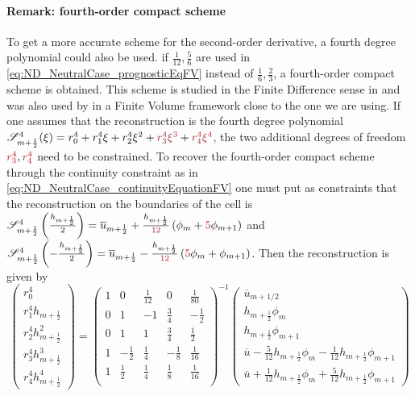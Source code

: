 \paragraph{Remark: fourth-order compact scheme}
To get a more accurate scheme for the second-order derivative,
a fourth degree polynomial could also be used.
if $\frac{1}{12}, \frac{5}{6}$ are used in
\eqref{eq:ND_NeutralCase_prognosticEqFV} instead of
$\frac{1}{6}, \frac{2}{3}$, a fourth-order compact scheme
is obtained. This scheme is studied in the Finite Difference sense
in \citep{adam_highly_1977} and was also used
by \citep{piller_finite-volume_2004} in a Finite Volume framework
close to the one we are using.
If one assumes that the reconstruction is the fourth degree
polynomial
${\cal S}_{m+\frac{1}{2}}^4(\xi) = r_0^4 + r_1^4 \xi + r_2^4 \xi^2 
+ \emphase{r_3^4 \xi^3} + \emphase{r_4^4 \xi^4}$,
the two additional degrees of freedom $\emphase{r_3^4},
\emphase{r_4^4}$ need to be
constrained. To recover the fourth-order compact scheme through
the continuity constraint as in
\eqref{eq:ND_NeutralCase_continuityEquationFV}
one must put as constraints that the
reconstruction on the boundaries of the cell is
${\cal S}^4_{m+\frac{1}{2}}\left(\frac{h_{m+\frac{1}{2}}}{2}\right) =
\overline{u}_{m+\frac{1}{2}} +
\frac{h_{m+\frac{1}{2}}}{\emphase{12}}\left(
\phi_m + \emphase{5}\phi_{m+1}\right) $ and
${\cal S}^4_{m+\frac{1}{2}}\left(-\frac{h_{m+\frac{1}{2}}}{2}\right) =
\overline{u}_{m+\frac{1}{2}} -
\frac{h_{m+\frac{1}{2}}}{\emphase{12}}\left(
\emphase{5}\phi_m + \phi_{m+1}\right)$.
Then the reconstruction is given by
\begin{equation}
    \begin{pmatrix}
    r_0^4 \\
    r_1^4 h_{m+\frac{1}{2}} \\
    r_2^4 h_{m+\frac{1}{2}}^2 \\
    r_3^4 h_{m+\frac{1}{2}}^3 \\
    r_4^4 h_{m+\frac{1}{2}}^4
    \end{pmatrix}
     = 
    \begin{pmatrix}
    1 & 0 & \frac{1}{12} & 0 & \frac{1}{80} \\
    0 & 1 & -1 & \frac{3}{4} & -\frac{1}{2} \\
    0 & 1 & 1 & \frac{3}{4} & \frac{1}{2} \\
    1 & -\frac{1}{2} & \frac{1}{4} & -\frac{1}{8}
    & \frac{1}{16} \\
    1 & \frac{1}{2} & \frac{1}{4} & \frac{1}{8}
    & \frac{1}{16} \\
    \end{pmatrix}^{-1}
    \begin{pmatrix}
    \overline{u}_{m+1/2} \\
    h_{m+\frac{1}{2}} \phi_m \\
	    h_{m+\frac{1}{2}} \phi_{m+1} \\
	    \overline{u} - \frac{5}{12} h_{m+\frac{1}{2}} \phi_m
	    - \frac{1}{12} h_{m+\frac{1}{2}} \phi_{m+1} \\
	    \overline{u} + \frac{1}{12} h_{m+\frac{1}{2}} \phi_m
	    + \frac{5}{12} h_{m+\frac{1}{2}} \phi_{m+1}
    \end{pmatrix}
\end{equation}

